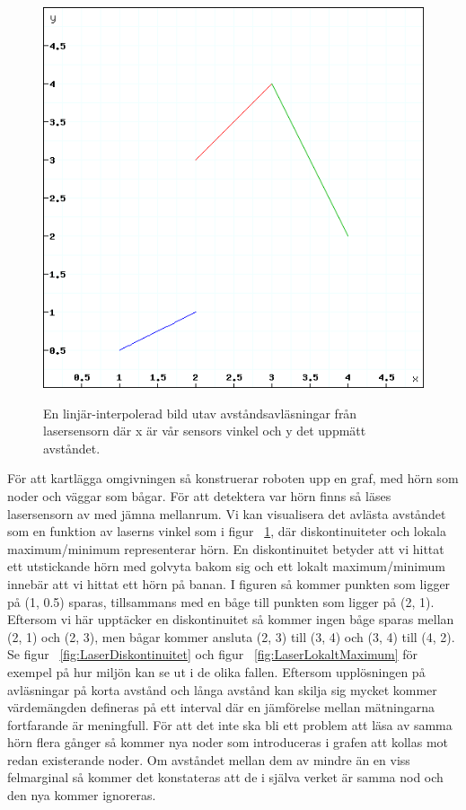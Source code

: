 \documentclass{article}
\begin{document}
\begin{figure}[H]
  \centering
  \includegraphics[scale=0.5]{Laserfunktionskurva} \\
  \caption{En linjär-interpolerad bild utav avståndsavläsningar från lasersensorn där x är vår sensors vinkel och y det uppmätt avståndet.}
  \label{fig:Laserfunktionskurva}
\end{figure}

För att kartlägga omgivningen så konstruerar roboten upp en graf, med hörn som noder och väggar som bågar. För att detektera var hörn finns så läses lasersensorn av med jämna mellanrum. Vi kan visualisera det avlästa avståndet som en funktion av laserns vinkel som i figur ~\ref{fig:Laserfunktionskurva}, där diskontinuiteter och lokala maximum/minimum representerar hörn. En diskontinuitet betyder att vi hittat ett utstickande hörn med golvyta bakom sig och ett lokalt maximum/minimum innebär att vi hittat ett hörn på banan. I figuren så kommer punkten som ligger på (1, 0.5) sparas, tillsammans med en båge till punkten som ligger på (2, 1). Eftersom vi här upptäcker en diskontinuitet så kommer ingen båge sparas mellan (2, 1) och (2, 3), men bågar kommer ansluta (2, 3) till (3, 4) och (3, 4) till (4, 2). Se figur ~\ref{fig:LaserDiskontinuitet} och figur ~\ref{fig:LaserLokaltMaximum} för exempel på hur miljön kan se ut i de olika fallen. Eftersom upplösningen på avläsningar på korta avstånd och långa avstånd kan skilja sig mycket kommer värdemängden defineras på ett interval där en jämförelse mellan mätningarna fortfarande är meningfull. För att det inte ska bli ett problem att läsa av samma hörn flera gånger så kommer nya noder som introduceras i grafen att kollas mot redan existerande noder. Om avståndet mellan dem av mindre än en viss felmarginal så kommer det konstateras att de i själva verket är samma nod och den nya kommer ignoreras. \newline\newline
\end{document}
